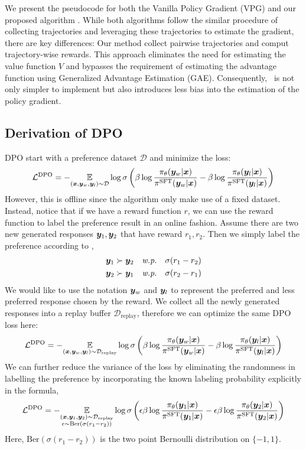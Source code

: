 \documentclass{article} %
\newcommand{\algn}{\text{P3O}}
\begin{document}
We present the pseudocode for both the Vanilla Policy Gradient (VPG) and our proposed algorithm \algn. While both algorithms follow the similar procedure of collecting trajectories and leveraging these trajectories to estimate the gradient, there are key differences: Our method collect pairwise trajectories and comput trajectory-wise rewards. This approach eliminates the need for estimating the value function $V$ and bypasses the requirement of estimating the advantage function using Generalized Advantage Estimation (GAE). Consequently, \algn\ is not only simpler to implement but also introduces less bias into the estimation of the policy gradient.

\subsection{Derivation of DPO}
\label{appendix:dpo}
DPO start with a preference dataset $\mathcal{D}$ and minimize the loss:
$$\mathcal{L}^{\text{DPO}} = -\underset{
({\bm{x}},{\bm{y}}_w,{\bm{y}}_l)\sim \mathcal{D}
}{\mathbb{E}}\log\sigma\left(\beta\log\frac{\pi_\theta({\bm{y}}_w|{\bm{x}})}{\pi^{\text{SFT}}({\bm{y}}_w|{\bm{x}})}-\beta\log\frac{\pi_\theta({\bm{y}}_l|{\bm{x}})}{\pi^{\text{SFT}}({\bm{y}}_l|{\bm{x}})}\right)$$
However, this is offline since the algorithm only make use of a fixed dataset. Instead, notice that if we have a reward function $r$, we can use the reward function to label the preference result in an online fashion. Assume there are two new generated responses ${\bm{y}}_1,{\bm{y}}_2$ that have reward $r_1, r_2$. Then we simply label the preference according to \citet{bradley1952rank},
\begin{align*}
    {\bm{y}}_1& \succ {\bm{y}}_2\quad\textit{w.p.}\quad\sigma(r_1-r_2)\\
    {\bm{y}}_2& \succ {\bm{y}}_1\quad\textit{w.p.}\quad\sigma(r_2-r_1)
\end{align*}
We would like to use the notation ${\bm{y}}_w$ and ${\bm{y}}_l$ to represent the preferred and less preferred response chosen by the reward. We collect all the newly generated responses into a replay buffer $\mathcal{D}_{\text{replay}}$, therefore we can optimize the same DPO loss here:
$$\mathcal{L}^{\text{DPO}} = -\underset{
({\bm{x}},{\bm{y}}_w,{\bm{y}}_l)\sim \mathcal{D}_{\text{replay}}
}{\mathbb{E}}\log\sigma\left(\beta\log\frac{\pi_\theta({\bm{y}}_w|{\bm{x}})}{\pi^{\text{SFT}}({\bm{y}}_w|{\bm{x}})}-\beta\log\frac{\pi_\theta({\bm{y}}_l|{\bm{x}})}{\pi^{\text{SFT}}({\bm{y}}_l|{\bm{x}})}\right)$$
We can further reduce the variance of the loss by eliminating the randomness in labelling the preference by incorporating the known labeling probability explicitly in the formula,
$$\mathcal{L}^{\text{DPO}} = -\underset{\substack{
({\bm{x}},{\bm{y}}_1,{\bm{y}}_2)\sim \mathcal{D}_{\text{replay}} \\
\epsilon \sim \text{Ber}(\sigma(r_1-r_2))
}}{\mathbb{E}}\log\sigma\left(\epsilon\beta\log\frac{\pi_\theta({\bm{y}}_1|{\bm{x}})}{\pi^{\text{SFT}}({\bm{y}}_1|{\bm{x}})}-\epsilon\beta\log\frac{\pi_\theta({\bm{y}}_2|{\bm{x}})}{\pi^{\text{SFT}}({\bm{y}}_2|{\bm{x}})}\right)$$
Here, $\text{Ber}(\sigma(r_1-r_2))$ is the two point Bernoulli distribution on $\{-1,1\}$.
\end{document}
